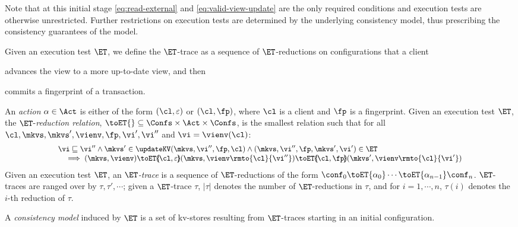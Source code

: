 Note that at this initial stage \eqref{eq:read-external} and \eqref{eq:valid-view-update} are the only required conditions and execution tests are otherwise unrestricted. 
Further restrictions on execution tests are determined by the underlying consistency model, thus prescribing the consistency guarantees of the model.

Given an execution test  $\ET$, we define the $\ET$-trace as a sequence of $\ET$-reductions on configurations that a client
\begin{enumerate*}
	\item advances the view to a more up-to-date view, and then
	\item commits a fingerprint of a transaction. 
\end{enumerate*}

\begin{definition}[$\ET$-trace]
\label{def:reduction}
An \emph{action} $\alpha \in \Act$ is either of the form $(\cl, \varepsilon)$ or $(\cl, \fp)$, 
where $\cl$ is a client and $\fp$ is a fingerprint. 
Given an execution test $\ET$, the $\ET$-\emph{reduction relation},
$\toET{} \subseteq \Confs \times \Act \times \Confs$, 
is the smallest relation such that for all $\cl, \mkvs, \mkvs', \vienv, \fp, \vi', \vi''$ and $\vi = \vienv(\cl)$:
%
{
\[
\small
\begin{array}{@{}l@{}}
    \vi \sqsubseteq \vi'' 
    \land \mkvs' \in \updateKV(\mkvs, \vi'', \fp, \cl)
    \land (\mkvs, \vi'', \fp, \mkvs', \vi') \in \ET \\
    \quad \implies
    (\mkvs, \vienv) \toET{\hspace{-5pt}(\cl, \varepsilon)\hspace{-5pt}} 
    (\mkvs, \vienv\rmto{\cl}{\vi''}) \toET{\hspace{-5pt}(\cl,\fp)\hspace{-5pt}} (\mkvs', \vienv\rmto{\cl}{\vi'})
\end{array}
\]
}
%
Given an execution test $\ET$, an \emph{$\ET$-trace} is a sequence of $\ET$-reductions of the form $\conf_{0} \toET{\alpha_{0}} \cdots \toET{\alpha_{n-1}} \conf_{n}$. $\ET$-traces are ranged over by $\tau, \tau', \cdots$; 
given a $\ET$-trace $\tau$, $\lvert \tau \rvert$ denotes the number of $\ET$-reductions in $\tau$, and 
for $i=1,\cdots,n$, $\tau(i)$ denotes the $i$-th reduction of $\tau$.
\end{definition}

A \emph{consistency model} induced by $\ET$ is a set of kv-stores
resulting from $\ET$-traces starting in an 
initial configuration. 

